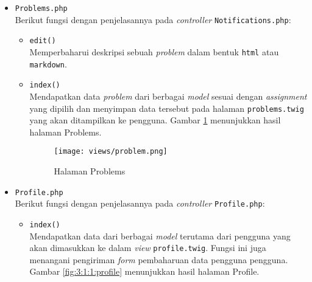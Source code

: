 \begin{itemize}
\begin{itemize}
	      \end{itemize}

	\item \verb|Problems.php| \\
	      Berikut fungsi dengan penjelasannya pada \textit{controller} \verb|Notifications.php|:

	      \begin{itemize}
		      \item \verb|edit()| \\
		            Memperbaharui deskripsi sebuah \textit{problem} dalam bentuk \verb|html| atau \verb|markdown|.
		      \item \verb|index()| \\
		            Mendapatkan data \textit{problem} dari berbagai \textit{model} sesuai dengan \textit{assignment} yang dipilih dan menyimpan data tersebut pada halaman \verb|problems.twig| yang akan ditampilkan ke pengguna. Gambar \ref{fig:3:1:1:problem} menunjukkan hasil halaman Problems.

		            \begin{figure}[H]
			            \centering
			            \texttt{[image: views/problem.png]}
			            \caption{Halaman Problems}
			            \label{fig:3:1:1:problem}
		            \end{figure}

	      \end{itemize}

	\item \verb|Profile.php| \\
	      Berikut fungsi dengan penjelasannya pada \textit{controller} \verb|Profile.php|:

	      \begin{itemize}
		      \item \verb|index()| \\
		            Mendapatkan data dari berbagai \textit{model} terutama dari pengguna yang akan dimasukkan ke dalam \textit{view} \verb|profile.twig|. Fungsi ini juga menangani pengiriman \textit{form} pembaharuan data pengguna pengguna. Gambar \ref{fig:3:1:1:profile} menunjukkan hasil halaman Profile.


\end{itemize}
\end{itemize}
